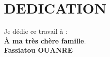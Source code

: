 \chapter*{DEDICATION}
\thispagestyle{MyStyle}
%
\begin{center}
{\huge Je} dédie ce travail à : \\

\vspace{1 cm}
\textbf{À ma très chère famille}.\\

\vspace{1 cm}
 \hspace{10 cm}
 \textbf{Fassiatou OUANRE}
\end{center}
 